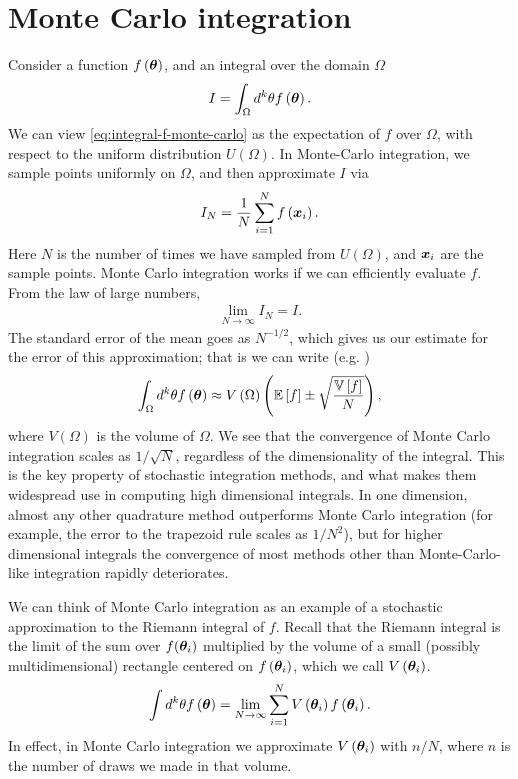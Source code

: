\section{Monte Carlo integration\label{eq:Monte-Carlo-integration}}

Consider a function $f\left({\bm \theta}\right)$, and an integral over the domain $\Omega$
\begin{align}
    \label{eq:integral-f-monte-carlo}
    I
    =
    \int_{\Omega} d^k\theta f\left({\bm \theta}\right)
    .
\end{align}
We can view \eqref{eq:integral-f-monte-carlo} as the expectation of $f$ 
over $\Omega$, with respect to the uniform distribution $U\left(\Omega\right)$.
In Monte-Carlo integration, we sample points uniformly on $\Omega$, and then
approximate $I$ via
\begin{align}
    \label{eq:monte-carlo-integral-f}
    I_N
    = 
    \frac{1}{N}\sum_{i=1}^N f\left({\bm x}_i\right)
    .
\end{align}
Here $N$ is the number of times we have sampled from $U\left(\Omega\right)$,
and ${\bm x}_i$ are the sample points.
Monte Carlo integration works if we can efficiently evaluate $f$. 
From the law of large numbers,
\begin{align}
    \lim_{N\to\infty}I_N = I
    .
\end{align}
The standard error of the mean goes as $N^{-1/2}$, which gives us our estimate
for the error of this approximation; that is we can write (e.g. \cite{PresTeukVettFlan92})
\begin{align}
    \int_{\Omega} d^k\theta f\left({\bm \theta}\right)
    \approx
    V\left(\Omega\right)
    \left(
        \mathbb{E}\left[f\right]
        \pm
        \sqrt{\frac{\mathbb{V}\left[f\right]}{N}}
    \right)
    ,
\end{align}
where $V\left(\Omega\right)$ is the volume of $\Omega$.
We see that the convergence of Monte Carlo integration scales as $1/\sqrt{N}$,
regardless of the dimensionality of the integral.
This is the key property of stochastic integration methods, and what makes them
widespread use in computing high dimensional integrals.
In one dimension, almost any other quadrature method outperforms Monte Carlo integration 
(for example, the error to the trapezoid rule scales as $1/N^2$),
but for higher dimensional integrals the convergence of most methods other than Monte-Carlo-like integration rapidly deteriorates.

We can think of Monte Carlo integration as an example of a stochastic approximation
to the Riemann integral of $f$.
Recall that the Riemann integral is the limit of the sum over $f({\bm \theta}_i)$
multiplied by the volume of a small (possibly multidimensional) 
rectangle centered on $f\left({\bm \theta}_i\right)$,
which we call $V\left({\bm \theta}_i\right)$.
\begin{align}
    \int d^k\theta f\left({\bm \theta}\right)
    =
    \lim_{N\to\infty}\sum_{i=1}^N V\left({\bm \theta}_i\right)f\left({\bm \theta}_i\right)
    .
\end{align}
In effect, in Monte Carlo integration we approximate $V\left({\bm \theta}_i\right)$
with $n/N$, where $n$ is the number of draws we made in that volume.

